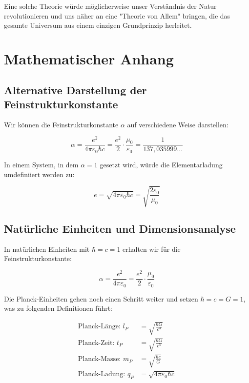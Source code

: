 \documentclass{article}
\begin{document}
Eine solche Theorie würde möglicherweise unser Verständnis der Natur revolutionieren und uns näher an eine "Theorie von Allem" bringen, die das gesamte Universum aus einem einzigen Grundprinzip herleitet.

\section{Mathematischer Anhang}

\subsection{Alternative Darstellung der Feinstrukturkonstante}

Wir können die Feinstrukturkonstante $\alpha$ auf verschiedene Weise darstellen:

\begin{equation}
	\alpha = \frac{e^2}{4\pi\varepsilon_0\hbar c} = \frac{e^2}{2} \cdot \frac{\mu_0}{\varepsilon_0} = \frac{1}{137,035999...}
\end{equation}

In einem System, in dem $\alpha = 1$ gesetzt wird, würde die Elementarladung umdefiniiert werden zu:

\begin{equation}
	e = \sqrt{4\pi\varepsilon_0\hbar c} = \sqrt{\frac{2\varepsilon_0}{\mu_0}}
\end{equation}

\subsection{Natürliche Einheiten und Dimensionsanalyse}

In natürlichen Einheiten mit $\hbar = c = 1$ erhalten wir für die Feinstrukturkonstante:

\begin{equation}
	\alpha = \frac{e^2}{4\pi\varepsilon_0} = \frac{e^2}{2} \cdot \frac{\mu_0}{\varepsilon_0}
\end{equation}

Die Planck-Einheiten gehen noch einen Schritt weiter und setzen $\hbar = c = G = 1$, was zu folgenden Definitionen führt:

\begin{align}
	\text{Planck-Länge: } l_P &= \sqrt{\frac{\hbar G}{c^3}} \\
	\text{Planck-Zeit: } t_P &= \sqrt{\frac{\hbar G}{c^5}} \\
	\text{Planck-Masse: } m_P &= \sqrt{\frac{\hbar c}{G}} \\
	\text{Planck-Ladung: } q_P &= \sqrt{4\pi\varepsilon_0\hbar c}
\end{align}
\end{document}

